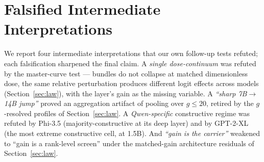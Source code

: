 \documentclass[preprint,12pt]{elsarticle}
\theoremstyle{definition}
\begin{document}
\section{Falsified Intermediate Interpretations}\label{sec:falsified}
We report four intermediate interpretations that our own follow-up tests refuted; each
falsification sharpened the final claim. A \emph{single dose-continuum} was refuted by the
master-curve test --- bundles do not collapse at matched dimensionless dose, the same
relative perturbation produces \doseSpread{} different logit effects across models
(Section~\ref{sec:law}), with the layer's gain as the missing variable. A \emph{``sharp
7B$\to$14B jump''} proved an aggregation artifact of pooling over $g\leq20$, retired by
the $g$-resolved profiles of Section~\ref{sec:law}. A \emph{Qwen-specific} constructive
regime was refuted by Phi-3.5 (majority-constructive at its deep layer) and by GPT-2-XL
(the most extreme constructive cell, at 1.5B). And \emph{``gain is the carrier''} weakened
to ``gain is a rank-level screen'' under the matched-gain architecture residuals of
Section~\ref{sec:law}.
\end{document}
